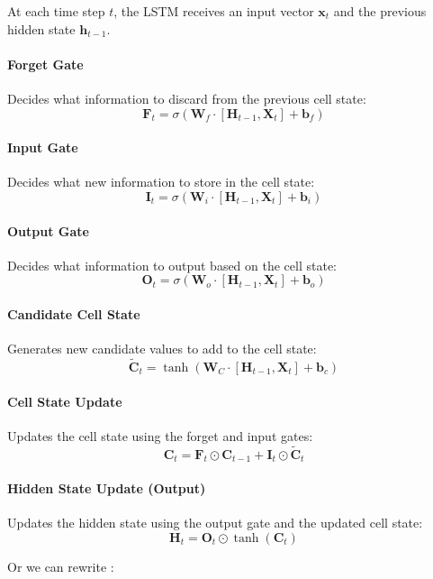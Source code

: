 \documentclass[letterpaper,11pt]{article}
\begin{document}
\bigskip


At each time step \( t \), the LSTM receives an input vector \(\mathbf{x}_t\) and the previous hidden state \(\mathbf{h}_{t-1}\).


\paragraph*{Forget Gate}
Decides what information to discard from the previous cell state:
\[
\mathbf{F}_t = \sigma(\mathbf{W}_f \cdot [\mathbf{H}_{t-1}, \mathbf{X}_t] + \mathbf{b}_f)
\]

\paragraph*{Input Gate}
Decides what new information to store in the cell state:
\[
\mathbf{I}_t = \sigma(\mathbf{W}_i \cdot [\mathbf{H}_{t-1}, \mathbf{X}_t] + \mathbf{b}_i)
\]

\paragraph*{Output Gate}
Decides what information to output based on the cell state:
\[
\mathbf{O}_t = \sigma(\mathbf{W}_o \cdot [\mathbf{H}_{t-1}, \mathbf{X}_t] + \mathbf{b}_o)
\]

\paragraph*{Candidate Cell State}
Generates new candidate values to add to the cell state:
\[
\tilde{\mathbf{C}}_t = \tanh(\mathbf{W}_C \cdot [\mathbf{H}_{t-1}, \mathbf{X}_t] + \mathbf{b}_c)
\]

\paragraph*{Cell State Update}
Updates the cell state using the forget and input gates:
\[
\mathbf{C}_t = \mathbf{F}_t \odot \mathbf{C}_{t-1} + \mathbf{I}_t \odot \tilde{\mathbf{C}}_t
\]


\paragraph*{Hidden State Update (Output)\\}
Updates the hidden state using the output gate and the updated cell state:
\[
\mathbf{H}_t = \mathbf{O}_t \odot \tanh(\mathbf{C}_t)
\]

Or we can rewrite :
\end{document}
